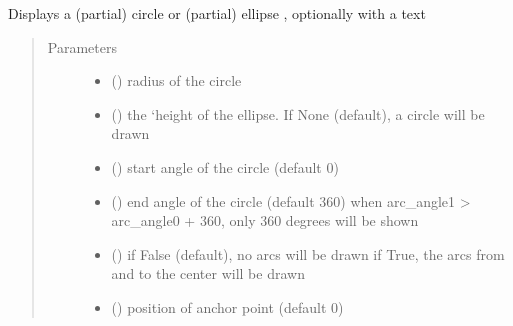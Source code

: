 \documentclass[letterpaper,10pt,english]{sphinxmanual}
\begin{document}

\begin{fulllineitems}
\label{\detokenize{Reference:salabim.AnimateCircle}}
Displays a (partial) circle or (partial) ellipse , optionally with a text
\begin{quote}\begin{description}
\item[{Parameters}] \leavevmode\begin{itemize}
\item {} 
 () \textendash{} radius of the circle

\item {} 
 () \textendash{} the ‘height of the ellipse. If None (default), a circle will be drawn

\item {} 
 () \textendash{} start angle of the circle (default 0)

\item {} 
 () \textendash{} end angle of the circle (default 360) 
when arc\_angle1 \textgreater{} arc\_angle0 + 360, only 360 degrees will be shown

\item {} 
 () \textendash{} if False (default), no arcs will be drawn
if True, the arcs from and to the center will be drawn

\item {} 
 () \textendash{} position of anchor point (default 0)


\end{itemize}
\end{description}
\end{quote}
\end{fulllineitems}
\end{document}
